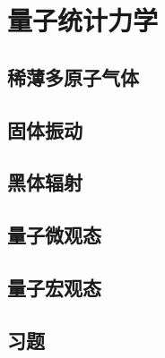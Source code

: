 \chapter{量子统计力学}

\section{稀薄多原子气体}
\section{固体振动}
\section{黑体辐射}
\section{量子微观态}
\section{量子宏观态}
\section*{习题}